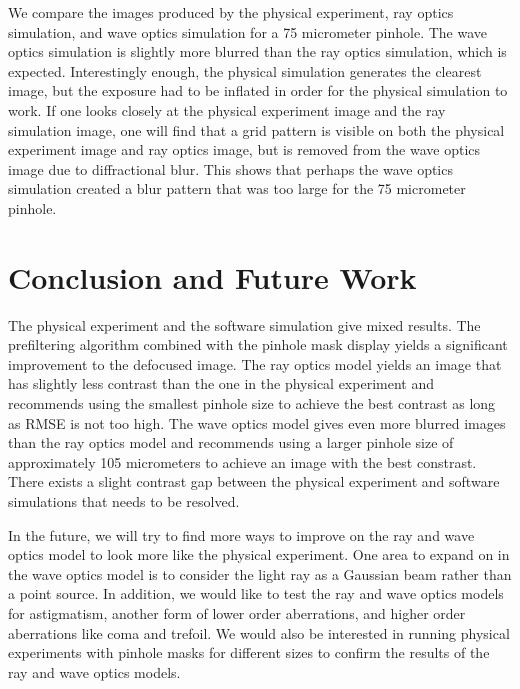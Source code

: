 We compare the images produced by the physical experiment, ray optics simulation, and wave optics simulation for a 75 micrometer pinhole. The wave optics simulation is slightly more blurred than the ray optics simulation, which is expected. Interestingly enough, the physical simulation generates the clearest image, but the exposure had to be inflated in order for the physical simulation to work. If one looks closely at the physical experiment image and the ray simulation image, one will find that a grid pattern is visible on both the physical experiment image and ray optics image, but is removed from the wave optics image due to diffractional blur. This shows that perhaps the wave optics simulation created a blur pattern that was too large for the 75 micrometer pinhole. 

\section{Conclusion and Future Work}

The physical experiment and the software simulation give mixed results. The prefiltering algorithm combined with the pinhole mask display yields a significant improvement to the defocused image. The ray optics model yields an image that has slightly less contrast than the one in the physical experiment and recommends using the smallest pinhole size to achieve the best contrast as long as RMSE is not too high. The wave optics model gives even more blurred images than the ray optics model and recommends using a larger pinhole size of approximately 105 micrometers to achieve an image with the best constrast. There exists a slight contrast gap between the physical experiment and software simulations that needs to be resolved.

In the future, we will try to find more ways to improve on the ray and wave optics model to look more like the physical experiment. One area to expand on in the wave optics model is to consider the light ray as a Gaussian beam rather than a point source. In addition, we would like to test the ray and wave optics models for astigmatism, another form of lower order aberrations, and higher order aberrations like coma and trefoil. We would also be interested in running physical experiments with pinhole masks for different sizes to confirm the results of the ray and wave optics models. 